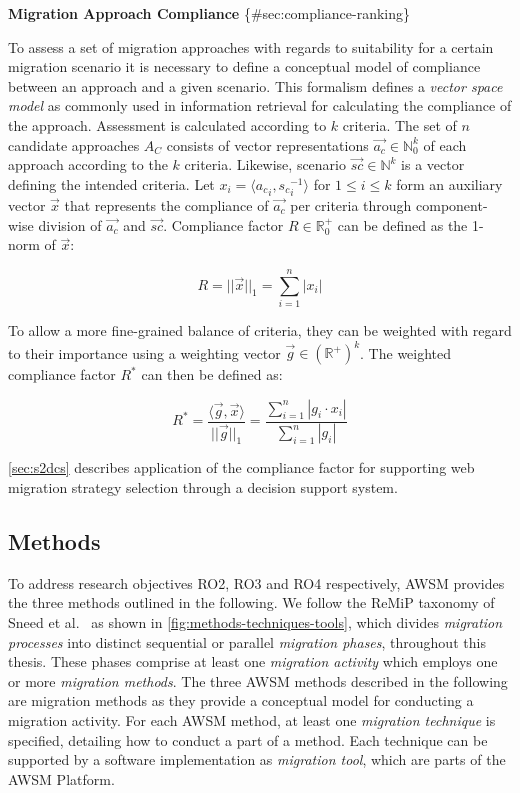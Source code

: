\textbf{Migration Approach Compliance} \{\#sec:compliance-ranking\}

To assess a set of migration approaches with regards to suitability for a certain migration scenario it is necessary to define a conceptual model of compliance between an approach and a given scenario.
This formalism defines a \emph{vector space model} \autocite{Salton1975VectorSpace} as commonly used in information retrieval for calculating the compliance of the approach.
Assessment is calculated according to \(k\) criteria.
The set of \(n\) candidate approaches \(A_C\) consists of vector representations \(\vec{a_c} \in \mathbb{N}_0^k\) of each approach according to the \(k\) criteria.
Likewise, scenario \(\vec{sc} \in \mathbb{N}^k\) is a vector defining the intended criteria.
Let \(x_i = \langle {a_c}_{i}, {s_c}_i^{-1} \rangle\) for \(1 \leq i \leq k\) form an auxiliary vector \(\vec x\) that represents the compliance of \(\vec{a_c}\) per criteria through component-wise division of \(\vec{a_c}\) and \(\vec{sc}\).
Compliance factor \(R\in \mathbb{R}_0^+\) can be defined as the 1-norm of \(\vec{x}\):

\begin{equation}R = ||\vec x||_1 = \sum_{i=1}^n |x_i|\label{eq:compliance-factor}\end{equation}

To allow a more fine-grained balance of criteria, they can be weighted with regard to their importance using a weighting vector \(\vec g \in (\mathbb{R}^+)^k\).
The weighted compliance factor \(R^*\) can then be defined as:

\begin{equation}R^* = \frac{\langle \vec g, \vec x \rangle }{ ||\vec g||_1} = \frac{\sum_{i=1}^n |g_i \cdot x_i|}{ \sum_{i=1}^n |g_i|}\label{eq:weighted-compliance-factor}\end{equation}

\cref{sec:s2dcs} describes application of the compliance factor for supporting web migration strategy selection through a decision support system.

\hypertarget{methods}{%
\subsection{Methods}\label{methods}}

To address research objectives RO2, RO3 and RO4 respectively, AWSM provides the three methods outlined in the following.
We follow the ReMiP taxonomy of Sneed et al.~\autocite{Sneed2010SoftwareMigration} as shown in \cref{fig:methods-techniques-tools}, which divides \emph{migration processes} into distinct sequential or parallel \emph{migration phases}, throughout this thesis.
These phases comprise at least one \emph{migration activity} which employs one or more \emph{migration methods}.
The three AWSM methods described in the following are migration methods as they provide a conceptual model for conducting a migration activity.
For each AWSM method, at least one \emph{migration technique} is specified, detailing how to conduct a part of a method.
Each technique can be supported by a software implementation as \emph{migration tool}, which are parts of the AWSM Platform.

